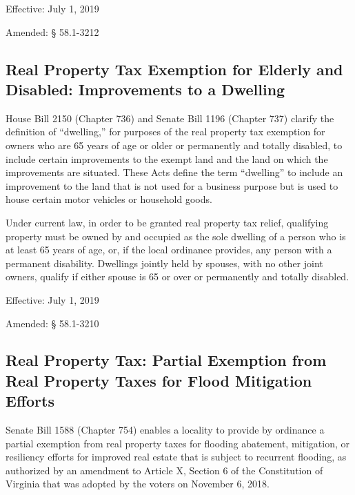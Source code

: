 \documentclass[
]{book}
\begin{document}
Effective: July 1, 2019

Amended: § 58.1-3212

\hypertarget{real-property-tax-exemption-for-elderly-and-disabled-improvements-to-a-dwelling}{%
\subsection{Real Property Tax Exemption for Elderly and Disabled: Improvements to a Dwelling}\label{real-property-tax-exemption-for-elderly-and-disabled-improvements-to-a-dwelling}}

House Bill 2150 (Chapter 736) and Senate Bill 1196 (Chapter 737) clarify the definition of ``dwelling,'' for purposes of the real property tax exemption for owners who are 65 years of age or older or permanently and totally disabled, to include certain improvements to the exempt land and the land on which the improvements are situated. These Acts define the term ``dwelling'' to include an improvement to the land that is not used for a business purpose but is used to house certain motor vehicles or household goods.

Under current law, in order to be granted real property tax relief, qualifying property must be owned by and occupied as the sole dwelling of a person who is at least 65 years of age, or, if the local ordinance provides, any person with a permanent disability. Dwellings jointly held by spouses, with no other joint owners, qualify if either spouse is 65 or over or permanently and totally disabled.

Effective: July 1, 2019

Amended: § 58.1-3210

\hypertarget{real-property-tax-partial-exemption-from-real-property-taxes-for-flood-mitigation-efforts}{%
\subsection{Real Property Tax: Partial Exemption from Real Property Taxes for Flood Mitigation Efforts}\label{real-property-tax-partial-exemption-from-real-property-taxes-for-flood-mitigation-efforts}}

Senate Bill 1588 (Chapter 754) enables a locality to provide by ordinance a partial exemption from real property taxes for flooding abatement, mitigation, or resiliency efforts for improved real estate that is subject to recurrent flooding, as authorized by an amendment to Article X, Section 6 of the Constitution of Virginia that was adopted by the voters on November 6, 2018.
\end{document}
